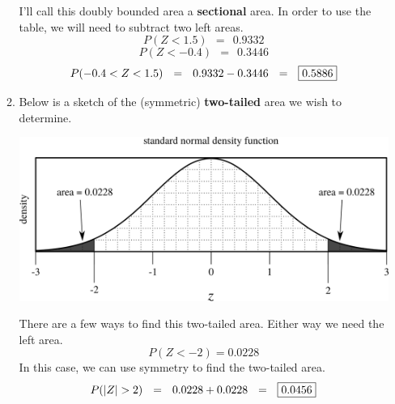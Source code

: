 \documentclass[12pt,letterpaper]{article}
\begin{document}
\begin{enumerate}
\begin{enumerate}
\begin{center}
\end{center}
I'll call this doubly bounded area a {\bf sectional} area. In order to use the table, we will need to subtract two left areas.
$$P(Z<1.5)~~ =~~ 0.9332 $$
$$P(Z<-0.4)~~ =~~ 0.3446 $$
$$P(-0.4 < Z < 1.5)~~ =~~ 0.9332-0.3446 ~~=~~ \fbox{0.5886} $$
\vfill
\item Below is a sketch of the (symmetric) {\bf two-tailed} area we wish to determine.
\begin{center}
\includegraphics[scale=0.8]{figures/hw3p1d.png}
\end{center}
There are a few ways to find this two-tailed area. Either way we need the left area.
$$P(Z<-2) = 0.0228 $$
In this case, we can use symmetry to find the two-tailed area.
$$P(|Z|>2) ~~=~~ 0.0228+0.0228 ~~=~~ \fbox{0.0456} $$
\vfill
\end{enumerate}


\end{enumerate}
\end{document}
